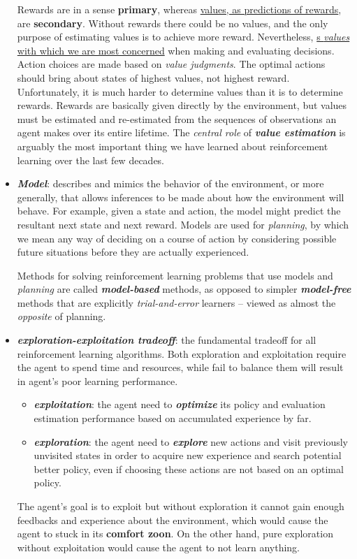 \documentclass[11pt]{article}
\begin{document}
\begin{itemize}
Rewards are in a sense \textbf{primary}, whereas  \underline{values, as predictions of rewards}, are \textbf{secondary}. Without rewards there could be no values, and the only purpose of estimating values is to achieve more reward. Nevertheless,  \underline{s \emph{values} with which we are most concerned} when making and evaluating decisions. Action choices are made based on \emph{value judgments}. The optimal actions should bring about states of highest values, not highest reward. Unfortunately, it is much harder to determine values than it is to determine rewards. Rewards are basically given directly by the environment, but values must be estimated and re-estimated from the sequences of observations an agent makes over its entire lifetime. The \emph{central role} of \emph{\textbf{value estimation}} is arguably the most important thing we have learned about reinforcement learning over the last few decades.

\item \emph{\textbf{Model}}: describes and mimics the behavior of the environment, or more generally, that allows inferences to be made about how the environment will behave. For example, given a state and action, the model might predict the resultant next state and next reward. Models are used for \emph{planning}, by which we mean any way of deciding on a course of action by considering possible future situations before they are actually experienced.

Methods for solving reinforcement learning problems that use models and \emph{planning} are called \emph{\textbf{model-based}} methods, as opposed to simpler \emph{\textbf{model-free}} methods that are explicitly \emph{trial-and-error} learners -- viewed as almost the \emph{opposite} of planning.

\item \emph{\textbf{exploration-exploitation tradeoff}}: the fundamental tradeoff for all reinforcement learning algorithms. Both exploration and exploitation require the agent to spend time and resources, while fail to balance them will result in agent's poor learning performance.
\begin{itemize}
\item \emph{\textbf{exploitation}}: the agent need to \emph{\textbf{optimize}} its policy and evaluation estimation performance based on accumulated experience by far. 

\item \emph{\textbf{exploration}}: the agent need to  \emph{\textbf{explore}} new actions and visit previously unvisited states in order to acquire new experience and search potential better policy, even if choosing these actions are not based on an optimal policy.
\end{itemize} The agent's goal is to exploit but without exploration it cannot gain enough feedbacks and experience about the environment, which would cause the agent to stuck in its \textbf{comfort zoon}. On the other hand, pure exploration without exploitation would cause the agent to not learn anything. 
\end{itemize}
\end{document}
